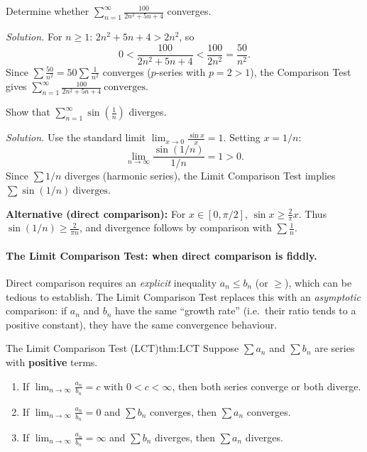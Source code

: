 \begin{examplebox}[title={Worked Example (Lecture Example 5.4): direct comparison}]
Determine whether $\displaystyle\sum_{n=1}^{\infty}\frac{100}{2n^2+5n+4}$ converges.

\emph{Solution.}
For $n\ge 1$: $2n^2+5n+4>2n^2$, so
\[
0<\frac{100}{2n^2+5n+4}<\frac{100}{2n^2}=\frac{50}{n^2}.
\]
Since $\sum \frac{50}{n^2}=50\sum \frac{1}{n^2}$ converges ($p$-series with $p=2>1$), the Comparison Test gives $\displaystyle\boxed{\sum_{n=1}^{\infty}\frac{100}{2n^2+5n+4}\ \text{converges}}$.
\end{examplebox}

\begin{examplebox}[title={Worked Example (Tutorial 9, Q2(e)): $\sum \sin(1/n)$ diverges}]
Show that $\displaystyle\sum_{n=1}^{\infty}\sin\!\left(\frac{1}{n}\right)$ diverges.

\emph{Solution.}
Use the standard limit $\lim_{x\to 0}\frac{\sin x}{x}=1$. Setting $x=1/n$:
\[
\lim_{n\to\infty}\frac{\sin(1/n)}{1/n}=1>0.
\]
Since $\sum 1/n$ diverges (harmonic series), the Limit Comparison Test implies $\displaystyle\boxed{\sum \sin(1/n)\ \text{diverges}}$.

\textbf{Alternative (direct comparison):} For $x\in[0,\pi/2]$, $\sin x\ge \frac{2}{\pi}x$. Thus $\sin(1/n)\ge \frac{2}{\pi n}$, and divergence follows by comparison with $\sum \frac{1}{n}$.
\end{examplebox}

\paragraph{The Limit Comparison Test: when direct comparison is fiddly.}

Direct comparison requires an \emph{explicit} inequality $a_n\le b_n$ (or $\ge$), which can be tedious to establish.
The Limit Comparison Test replaces this with an \emph{asymptotic} comparison: if $a_n$ and $b_n$ have the same ``growth rate'' (i.e.\ their ratio tends to a positive constant), they have the same convergence behaviour.

\begin{theorem}{The Limit Comparison Test (LCT)}{thm:LCT}
Suppose $\sum a_n$ and $\sum b_n$ are series with \textbf{positive} terms.
\begin{enumerate}[label=(\roman*), leftmargin=3em]
\item If $\displaystyle\lim_{n\to\infty}\frac{a_n}{b_n}=c$ with $0<c<\infty$, then both series converge or both diverge.
\item If $\displaystyle\lim_{n\to\infty}\frac{a_n}{b_n}=0$ and $\sum b_n$ converges, then $\sum a_n$ converges.
\item If $\displaystyle\lim_{n\to\infty}\frac{a_n}{b_n}=\infty$ and $\sum b_n$ diverges, then $\sum a_n$ diverges.
\end{enumerate}
\end{theorem}

